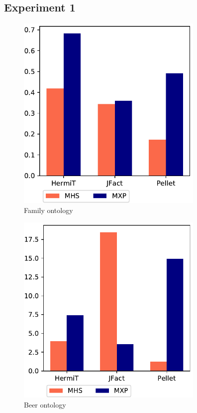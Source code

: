 \documentclass[12pt,a4paper]{article}
\begin{document}
\subsection{Experiment 1}

\begin{figure}[H]
	\centering
	\includegraphics[width=9cm]{eval1Family} 	
	\caption{Family ontology}
	\label{fig:eval1Family}
\end{figure}

\begin{figure}[H]
	\centering
	\includegraphics[width=9cm]{eval1Beer} 
	\caption{Beer ontology}
	\label{fig:eval1Beer}
\end{figure}
\end{document}
